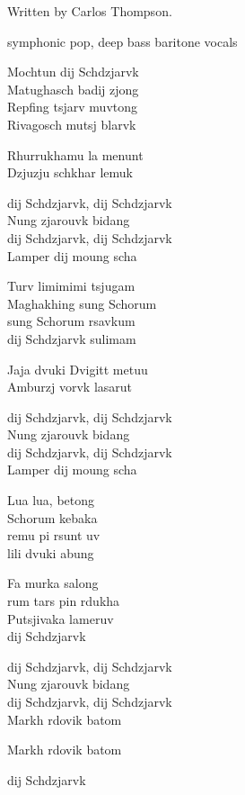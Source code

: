 
\label{sec:dij-schdzjarvk}
\begin{notes}
Written by Carlos Thompson.
\end{notes}
\begin{style}
symphonic pop, deep bass baritone vocals
\end{style}
\begin{lyrics}
Mochtun dij Schdzjarvk\\
Matughasch badij zjong\\
Repfing tsjarv muvtong\\
Rivagosch mutsj blarvk

Rhurrukhamu la menunt\\
Dzjuzju schkhar lemuk

dij Schdzjarvk, dij Schdzjarvk\\
Nung zjarouvk bidang\\
dij Schdzjarvk, dij Schdzjarvk\\
Lamper dij moung scha

Turv limimimi tsjugam\\
Maghakhing sung Schorum\\
sung Schorum rsavkum\\
dij Schdzjarvk sulimam

Jaja dvuki Dvigitt metuu\\
Amburzj vorvk lasarut

dij Schdzjarvk, dij Schdzjarvk\\
Nung zjarouvk bidang\\
dij Schdzjarvk, dij Schdzjarvk\\
Lamper dij moung scha

Lua lua, betong\\
Schorum kebaka\\
remu pi rsunt uv\\
lili dvuki abung

Fa murka salong\\
rum tars pin rdukha\\
Putsjivaka lameruv\\
dij Schdzjarvk

dij Schdzjarvk, dij Schdzjarvk\\
Nung zjarouvk bidang\\
dij Schdzjarvk, dij Schdzjarvk\\
Markh rdovik batom

Markh rdovik batom

dij Schdzjarvk
\end{lyrics}


